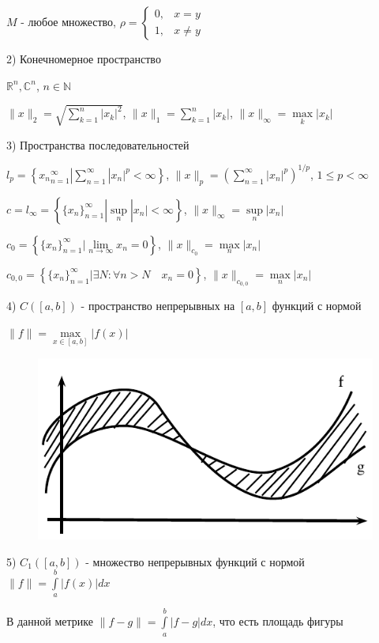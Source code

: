 \documentclass[a4paper]{report}
\begin{document}
$M$ - любое множество, $\rho=\begin{cases} 0,&x=y\\1,&x\ne y\end{cases}$

2) Конечномерное пространство

$\mathbb R^n,\mathbb C^n$, $n\in\mathbb N$

$\|x\|_2=\sqrt{\sum\limits_{k=1}^n|x_k|^2}$, 
$\|x\|_1=\sum\limits_{k=1}^n|x_k|$, $\|x\|_{\infty}=\max\limits_k|x_k|$

3) Пространства последовательностей

$l_p=\left\{{x_n}_{n=1}^\infty|\sum\limits_{n=1}^\infty|x_n|^p<\infty\right\}$, $\|x\|_p=\left(\sum\limits_{n=1}^\infty|x_n|^p\right)^{1/p}$, $1\le p<\infty$

$c=l_\infty=\left\{\{x_n\}_{n=1}^\infty|\sup\limits_n|x_n|<\infty\right\}$, $\|x\|_\infty=\sup\limits_n|x_n|$

$c_0=\left\{\{x_n\}_{n=1}^\infty|\lim\limits_{n\to\infty}x_n=0\right\}$, $\|x\|_{c_0}=\max\limits_n|x_n|$

$c_{0,0}=\left\{\{x_n\}_{n=1}^\infty|\exists N:\forall n>N\quad x_n=0\right\}$, $\|x\|_{c_{0,0}}=\max\limits_n|x_n|$

4) $C([a,b])$ - пространство непрерывных на $[a,b]$ функций с нормой 

$\|f\|=\max\limits_{x\in[a,b]}|f(x)|$

\noindent
\begin{figure} 
\includegraphics[width=\linewidth]{1}
\end{figure}

5) $C_1([a,b])$ - множество непрерывных функций с нормой $\|f\|=\displaystyle\int\limits_a^b|f(x)|dx$

В данной метрике $\|f-g\|=\displaystyle\int\limits_a^b|f-g|dx$, что есть площадь фигуры
\end{document}
